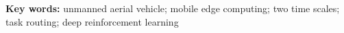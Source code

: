 \vspace{4mm}
\noindent\textbf{Key words:} unmanned aerial vehicle; mobile edge computing; two time scales; task routing; deep reinforcement learning
\par\endgroup

\vfill
{}

\vspace{4mm}
